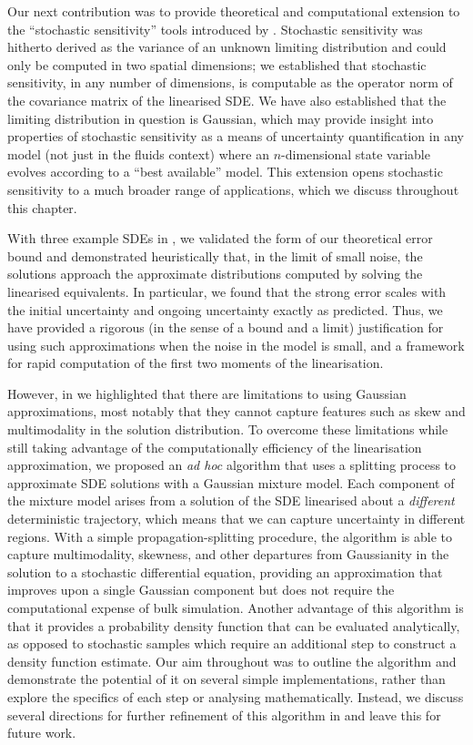Our next contribution was to provide theoretical and computational extension to the ``stochastic sensitivity'' tools introduced by \citet{Balasuriya_2020_StochasticSensitivityComputable}.
Stochastic sensitivity was hitherto derived as the variance of an unknown limiting distribution and could only be computed in two spatial dimensions; we established that stochastic sensitivity, in any number of dimensions, is computable as the operator norm of the covariance matrix of the linearised SDE.
We have also established that the limiting distribution in question is Gaussian, which may provide insight into properties of stochastic sensitivity as a means of uncertainty quantification in any model (not just in the fluids context) where an $ n $-dimensional state variable evolves according to a ``best available'' model.
This extension opens stochastic sensitivity to a much broader range of applications, which we discuss throughout this chapter.

With three example SDEs in , we validated the form of our theoretical error bound and demonstrated heuristically that, in the limit of small noise, the solutions approach the approximate distributions computed by solving the linearised equivalents.
In particular, we found that the strong error scales with the initial uncertainty and ongoing uncertainty exactly as predicted.
Thus, we have provided a rigorous (in the sense of a bound and a limit) justification for using such approximations when the noise in the model is small, and a framework for rapid computation of the first two moments of the linearisation.

However, in  we highlighted that there are limitations to using Gaussian approximations, most notably that they cannot capture features such as skew and multimodality in the solution distribution.
To overcome these limitations while still taking advantage of the computationally efficiency of the linearisation approximation, we proposed an \emph{ad hoc} algorithm that uses a splitting process to approximate SDE solutions with a Gaussian mixture model.
Each component of the mixture model arises from a solution of the SDE linearised about a \emph{different} deterministic trajectory, which means that we can capture uncertainty in different regions.
With a simple propagation-splitting procedure, the algorithm is able to capture multimodality, skewness, and other departures from Gaussianity in the solution to a stochastic differential equation, providing an approximation that improves upon a single Gaussian component but does not require the computational expense of bulk simulation.
Another advantage of this algorithm is that it provides a probability density function that can be evaluated analytically, as opposed to stochastic samples which require an additional step to construct a density function estimate.
Our aim throughout was to outline the algorithm and demonstrate the potential of it on several simple implementations, rather than explore the specifics of each step or analysing mathematically.
Instead, we discuss several directions for further refinement of this algorithm in  and leave this for future work.

